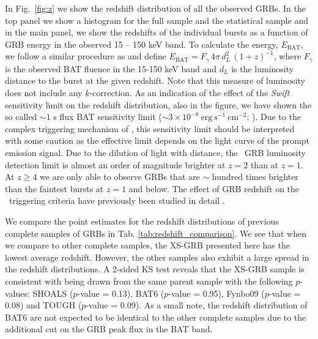\documentclass[longauth]{aa}    %
\begin{document}
In Fig.~\ref{fig:z} we show the redshift distribution of all  the observed GRBs.
In the top panel we show a histogram for the full sample and the statistical
sample and in the main panel, we show the redshifts of the individual bursts as
a function of GRB energy in the observed 15 -- 150 keV band. To calculate the
energy, $E_{\mathrm{BAT}}$, we follow a similar procedure as \citet{Lien2016}
and define $E_{\mathrm{BAT}} = F_{\gamma}\,4 \pi\,d_L^2\,(1+z)^{-1}$, where
$F_{\gamma}$ is the observed BAT fluence in the 15-150 keV band and $d_L$ is the
luminosity distance to the burst at the given redshift. Note that this measure
of luminosity does not include any $k$-correction. As an indication of the
effect of the \textit{Swift} sensitivity limit on the redshift distribution,
also in the figure, we have shown the so called $\sim 1$ s flux BAT sensitivity
limit ($\sim 3 \times 10^{-8}~\mathrm{erg}~\mathrm{s}^{-1}~\mathrm{cm}^{-2}$;
\citealt{Baumgartner2013, Lien2016}). Due to the complex triggering mechanism of
\swift, this sensitivity limit should be interpreted with some caution as the
effective limit depends on the light curve of the prompt emission signal. Due to
the dilution of light with distance, the \swift~GRB luminosity detection limit
is almost an order of magnitude brighter at $z=2$ than at $z=1$. At $z\geq4$ we
are only able to observe GRBs that are $\sim$ hundred times brighter than the
faintest bursts at $z=1$ and below. The effect of GRB redshift on the
\swift~triggering criteria have previously been studied in detail
\citep{Littlejohns2013a}.

We compare the point estimates for the redshift distributions of previous
complete samples of GRBs in Tab. \ref{tab:redshift_comparison}. We see that when
we compare to other complete samples, the XS-GRB presented here has the lowest
average redshift. However, the other samples also exhibit a large spread in the
redshift distributions. A 2-sided KS test reveals that the XS-GRB sample is
consistent with being drawn from the same parent sample with the following
$p$-values: SHOALS ($p$-value = 0.13), BAT6 ($p$-value = 0.95), Fynbo09
($p$-value = 0.08) and TOUGH ($p$-value = 0.09). As a small note, the redshift
distribution of BAT6 are not expected to be identical to the other complete
samples due to the additional cut on the GRB peak flux in the BAT band.
\end{document}
